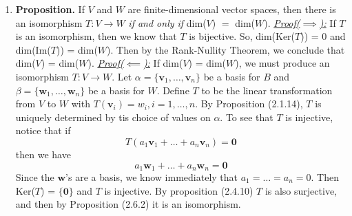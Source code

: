 \documentclass[oneside, 12pt]{book}
\newcommand{\settag}[1]{\renewcommand{\theenumi}{#1}}
\newcommand{\tbf}[1]{\textbf{#1}}
\newcommand{\tit}[1]{\textit{#1}}
\newcommand{\proofforward}{\tit{\underline{Proof($\implies$):}}}
\newcommand{\proofback}{\tit{\underline{Proof($\impliedby$):}}}
\newcommand{\trans}[3]{$#1:#2\rightarrow{}#3$}
\newcommand{\para}[1]{\item \tbf{#1}}
\newcommand{\vv}{\mathbf{v}}
\newcommand{\vw}{\mathbf{w}}
\begin{document}
\begin{enumerate}
    \settag{2.6.7}
    \para{Proposition.} If $V$ and $W$ are finite-dimensional vector spaces, then there is an isomorphism \trans{T}{V}{W} \tit{if and only if} dim($V$) $=$ dim($W$). \newline
    \proofforward \newline
    If $T$ is an isomorphism, then we know that $T$ is bijective. So,
    dim(Ker($T$)) = 0 and dim(Im($T$)) = dim($W$). Then by the Rank-Nullity Theorem, we conclude that dim($V$) = dim($W$).\newline
    \proofback \newline
    If dim($V$) = dim($W$), we must produce an isomorphism \trans{T}{V}{W}. Let $\alpha = \{\vv_1, \ldots, \vv_n\}$ be a basis for $B$ and $\beta = \{\vw_1,\ldots,\vw_n\}$ be a basis for $W$. Define $T$ to be the linear transformation from $V$ to $W$ with $T(\vv_i) = w_i, i = 1,\ldots,n$. By Proposition (2.1.14), $T$ is uniquely determined by tis choice of values on $\alpha$. To see that $T$ is injective, notice that if
    \begin{equation*}
        T(a_1\vv_1 + \ldots + a_n\vv_n) = \mathbf{0}
    \end{equation*}
    then we have
    \begin{equation*}
        a_1\vw_1 + \ldots + a_n\vw_n = \mathbf{0}
    \end{equation*}
    Since the $\vw$'s are a basis, we know immediately that $a_1 = \ldots = a_n = 0$. Then Ker($T$) = $\{\mathbf{0}\}$ and $T$ is injective. By proposition (2.4.10) $T$ is also surjective, and then by Proposition (2.6.2) it is an isomorphism.
    

\end{enumerate}
\end{document}
